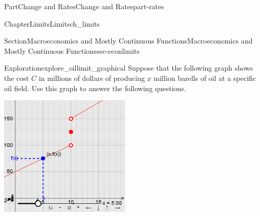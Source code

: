 \documentclass{tufte-book}
\numberwithin{equation}{chapter}
\begin{document}
\begin{partptx}{Part}{Change and Rates}{}{Change and Rates}{}{}{part-rates}
\begin{chapterptx}{Chapter}{Limits}{}{Limits}{}{}{ch_limits}
\begin{sectionptx}{Section}{Macroeconomics and Mostly Continuous Functions}{}{Macroeconomics and Mostly Continuous Functions}{}{}{sec-econlimits}
\begin{exploration}{Exploration}{}{explore_oillimit_graphical}%
Suppose that the following graph shows the cost \(C\) in millions of dollars of producing \(x\) million barells of oil at a specific oil field. Use this graph to answer the following questions.%
\begin{sidebyside}{2}{0.075}{0.075}{0.17}%
\begin{sbspanel}{0.47}%
\includegraphics[width=\linewidth]{external/jsxgraph-figure_oillimit.png}
\end{sbspanel}%
\begin{sbspanel}{0.21}%

\end{sbspanel}
\end{sidebyside}
\end{exploration}
\end{sectionptx}
\end{chapterptx}
\end{partptx}
\end{document}
